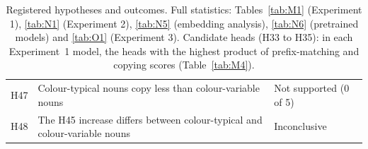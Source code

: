 \begin{table}[!htbp]
\begin{tabular}{@{}lp{}p{}@{}}
H47 & Colour-typical nouns copy less than colour-variable nouns & Not supported (0 of 5) \\
H48 & The H45 increase differs between colour-typical and colour-variable nouns & Inconclusive \\
\bottomrule
\end{tabular}
\caption{Registered hypotheses and outcomes. Full statistics: Tables~\ref{tab:M1} (Experiment 1), \ref{tab:N1} (Experiment 2), \ref{tab:N5} (embedding analysis), \ref{tab:N6} (pretrained models) and \ref{tab:O1} (Experiment 3). Candidate heads (H33 to H35): in each Experiment~1 model, the heads with the highest product of prefix-matching and copying scores (Table~\ref{tab:M4}).}
\label{tab:hyp}
\end{table}
